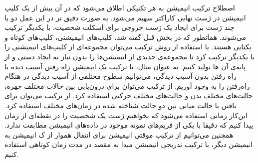 اصطلاح ترکیب انیمیشن به هر تکنیکی اطلاق می‌شود که در آن بیش از یک کلیپ انیمیشن در ژست نهایی کاراکتر سهیم می‌شود.
به صورت دقیق تر در این عمل دو یا چند ژست برای ایجاد یک ژست خروجی برای اسکلت شخصیت، با یکدیگر ترکیب می‌شوند.
همانطور که در بخش قبل گفته شد، کلیپ‌های انیمیشنی، کلیپ‌های کوتاه و یکتایی هستند. با استفاده از روش ترکیب ‌می‌توان مجموعه‌ای از کلیپ‌های انیمیشنی را با یکدیگر ترکیب کرد تا مجموعه‌ی جدیدی از انیمیشن‌ها را بدون نیاز به ایجاد دستی و از پایه‌ی آن ها تولید کنیم.
به عنوان مثال، با ترکیب یک انیمیشن راه رفتن آسیب دیده با راه رفتن بدون آسیب دیدگی، می‌توانیم سطوح مختلفی از آسیب دیدگی در هنگام راه‌رفتن را به وجود آوریم.
از ترکیب می‌توان برای درون‌یابی بین حالات مختلف چهره، حالت‌های مختلف بدن و حالت‌های مختلف حرکتی استفاده کرد.
از ترکیب می‌توان برای یافتن یا حالت میانی بین دو حالت شناخته شده در زمان‌های مختلف استفاده کرد. این‌کار زمانی استفاده می‌شود که بخواهیم ژست یک شخصیت را در نقطه‌ای از زمان پیدا کنیم که دقیقا با یکی از فریم‌های نمونه موجود در داده‌های انیمیشن مطابقت ندارد.
همچنین می‌توانیم از ترکیب موقتی انیمیشن برای انتقال هموار از ک انیمیشن به انیمیشن دیگر، با ترکیب تدریجی انیمیشن مبدا به مقصد در مدت زمان کوتاهی استفاده کنیم.